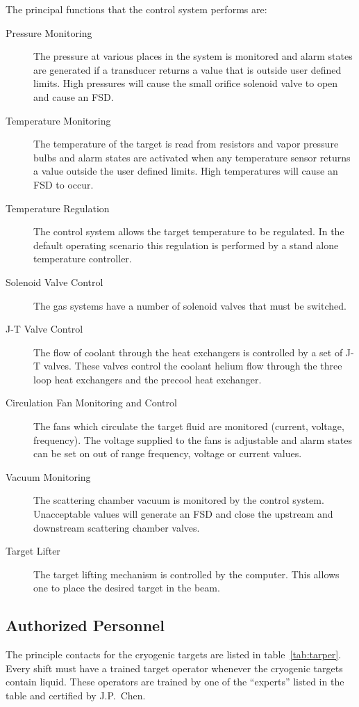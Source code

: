 {The principal functions that the control system performs are:
\begin{description}
\item[Pressure Monitoring] The pressure at various places in the system is
monitored and alarm states are generated if a transducer returns a value
that is outside user defined limits. High pressures will cause the
small orifice solenoid valve to open and cause an FSD.
\item[Temperature Monitoring] The temperature of the target
is read from resistors and vapor pressure bulbs and alarm states are
activated when any temperature sensor returns a value outside
the user defined limits. High temperatures will cause an FSD to occur.
\item[Temperature Regulation] The control system allows the target
temperature to be regulated. In the default operating scenario this regulation
is performed by a stand alone temperature controller.
\item[Solenoid Valve Control] The gas systems have a number of solenoid valves
that must be switched.
\item[J-T Valve Control] The flow of coolant through the heat exchangers
is controlled by a set of J-T valves. These valves control the coolant 
helium flow through the three loop heat exchangers and the precool heat
exchanger.
\item[Circulation Fan Monitoring and Control] The fans which circulate
the target fluid are monitored (current, voltage, frequency). The
voltage supplied to the fans is adjustable and alarm states can be set
on out of range frequency, voltage or current values.
\item[Vacuum Monitoring] The scattering chamber vacuum is monitored by
the control system. Unacceptable values will generate an FSD and close
the upstream and downstream  scattering chamber valves.
\item[Target Lifter] The target lifting mechanism is controlled by
the computer. This allows one to place the desired target in the beam.
\end{description}

\subsection{ Authorized Personnel}

The principle contacts for the cryogenic targets are listed in 
table~\ref{tab:tarper}. Every shift must have a trained target
operator whenever the cryogenic targets contain liquid. These
operators are trained by one of the ``experts'' listed in the
table and certified by J.P.~Chen.

}
